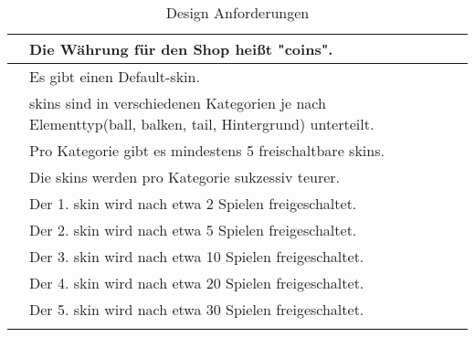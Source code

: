 \begin{xltabular}{\textwidth}{|l|X|r|r|}
     &  Die Währung für den Shop heißt "\glspl{coin}".         &      &      \\ \hline
      & Es gibt einen Default-\gls{skin}.           &      &      \\ \hline
      & \glspl{skin} sind in verschiedenen Kategorien je nach Elementtyp(\gls{ball}, \gls{balken}, \gls{tail}, Hintergrund) unterteilt.           &      &      \\ \hline
      & Pro Kategorie gibt es mindestens 5 freischaltbare \glspl{skin}.           &      &      \\ \hline
     & Die \glspl{skin} werden pro Kategorie sukzessiv teurer.           &      &      \\ \hline
      &  Der 1. \gls{skin} wird nach etwa 2 Spielen freigeschaltet.            &      &      \\ \hline %
      &  Der 2. \gls{skin} wird nach etwa 5 Spielen freigeschaltet.            &      &      \\ \hline
      &  Der 3. \gls{skin} wird nach etwa 10 Spielen freigeschaltet.            &      &      \\ \hline
      &  Der 4. \gls{skin} wird nach etwa 20 Spielen freigeschaltet.            &      &      \\ \hline
      &  Der 5. \gls{skin} wird nach etwa 30 Spielen freigeschaltet.            &      &      \\ \hline
    
    \caption{Design Anforderungen}\label{tab:design-requirements}
\end{xltabular}

\clearpage

